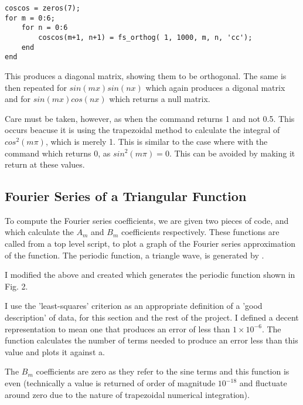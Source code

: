 \documentclass{article}
\begin{document}
\begin{lstlisting}
coscos = zeros(7); 
for m = 0:6;	
	for n = 0:6
        coscos(m+1, n+1) = fs_orthog( 1, 1000, m, n, 'cc');
    end
end 
\end{lstlisting}

This produces a diagonal matrix, showing them to be orthogonal. The same is then repeated for $sin(mx)sin(nx)$ which again produces a digonal matrix and for $sin(mx)cos(nx)$ which returns a null matrix.

Care must be taken, however, as when  the command  returns 1 and not 0.5. This occurs beacuse it is using the trapezoidal method to calculate the integral of $cos^2 (m \pi)$, which is merely 1. This is similar to the case where  with the command  which returns 0, as $sin^2 (m \pi) = 0$. This can be avoided by making it return  at these values.

\subsection{Fourier Series of a Triangular Function}

To compute the Fourier series coefficients, we are given two pieces of code,  and  which calculate the $ A_m $ and $ B_m $ coefficients respectively. These functions are called from a top level script,  to plot a graph of the Fourier series approximation of the function. The periodic function, a triangle wave, is generated by .

I modified the above and created  which generates the periodic function shown in Fig. 2. 

I use the 'least-squares' criterion as an appropriate definition of a 'good description' of data, for this section and the rest of the project. I defined a decent representation to mean one that produces an error of less than $1\times10^{-6} $. The function  calculates the number of terms needed to produce an error less than this value and plots it against a.

The $B_m$ coefficients are zero as they refer to the sine terms and this function is even (technically a value is returned of order of magnitude $10^{-18}$ and fluctuate around zero due to the nature of trapezoidal numerical integration).
\end{document}
